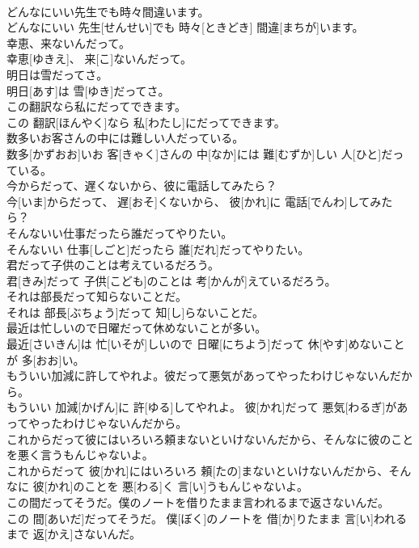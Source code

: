 \documentclass[8pt]{extreport}
\begin{document}
\begin{CJK}{UTF8}{min}
\\	どんなにいい先生でも時々間違います。	
\\	どんなにいい 先生[せんせい]でも 時々[ときどき] 間違[まちが]います。
\\	幸恵、来ないんだって。	
\\	幸恵[ゆきえ]、 来[こ]ないんだって。
\\	明日は雪だってさ。	
\\	明日[あす]は 雪[ゆき]だってさ。
\\	この翻訳なら私にだってできます。	
\\	この 翻訳[ほんやく]なら 私[わたし]にだってできます。
\\	数多いお客さんの中には難しい人だっている。	
\\	数多[かずおお]いお 客[きゃく]さんの 中[なか]には 難[むずか]しい 人[ひと]だっている。
\\	今からだって、遅くないから、彼に電話してみたら？	
\\	今[いま]からだって、 遅[おそ]くないから、 彼[かれ]に 電話[でんわ]してみたら？
\\	そんないい仕事だったら誰だってやりたい。	
\\	そんないい 仕事[しごと]だったら 誰[だれ]だってやりたい。
\\	君だって子供のことは考えているだろう。	
\\	君[きみ]だって 子供[こども]のことは 考[かんが]えているだろう。
\\	それは部長だって知らないことだ。	
\\	それは 部長[ぶちょう]だって 知[し]らないことだ。
\\	最近は忙しいので日曜だって休めないことが多い。	
\\	最近[さいきん]は 忙[いそが]しいので 日曜[にちよう]だって 休[やす]めないことが 多[おお]い。
\\	もういい加減に許してやれよ。彼だって悪気があってやったわけじゃないんだから。	
\\	もういい 加減[かげん]に 許[ゆる]してやれよ。 彼[かれ]だって 悪気[わるぎ]があってやったわけじゃないんだから。
\\	これからだって彼にはいろいろ頼まないといけないんだから、そんなに彼のことを悪く言うもんじゃないよ。	
\\	これからだって 彼[かれ]にはいろいろ 頼[たの]まないといけないんだから、そんなに 彼[かれ]のことを 悪[わる]く 言[い]うもんじゃないよ。
\\	この間だってそうだ。僕のノートを借りたまま言われるまで返さないんだ。	
\\	この 間[あいだ]だってそうだ。 僕[ぼく]のノートを 借[か]りたまま 言[い]われるまで 返[かえ]さないんだ。

\end{CJK}
\end{document}
